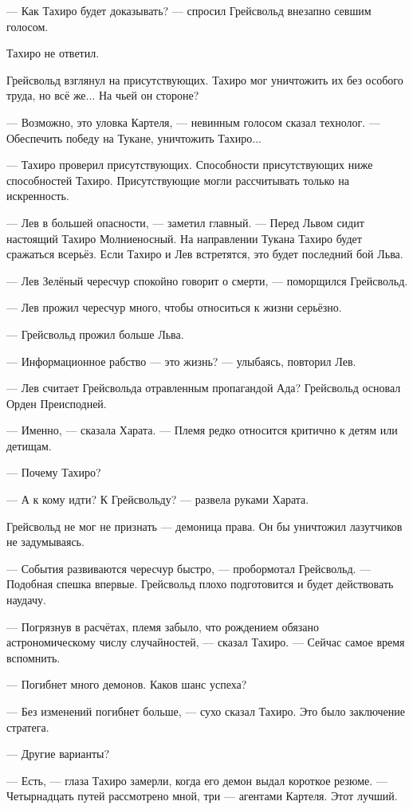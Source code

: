 --- Как Тахиро будет доказывать? --- спросил Грейсвольд внезапно севшим голосом.

Тахиро не ответил.

Грейсвольд взглянул на присутствующих.
Тахиро мог уничтожить их без особого труда, но всё же...
На чьей он стороне?

--- Возможно, это уловка Картеля, --- невинным голосом сказал технолог.
--- Обеспечить победу на Тукане, уничтожить Тахиро...

--- Тахиро проверил присутствующих.
Способности присутствующих ниже способностей Тахиро.
Присутствующие могли рассчитывать только на искренность.

--- Лев в большей опасности, --- заметил главный.
--- Перед Львом сидит настоящий Тахиро Молниеносный.
На направлении Тукана Тахиро будет сражаться всерьёз.
Если Тахиро и Лев встретятся, это будет последний бой Льва.

--- Лев Зелёный чересчур спокойно говорит о смерти, --- поморщился Грейсвольд.

--- Лев прожил чересчур много, чтобы относиться к жизни серьёзно.

--- Грейсвольд прожил больше Льва.

--- Информационное рабство --- это жизнь? --- улыбаясь, повторил Лев.

--- Лев считает Грейсвольда отравленным пропагандой Ада?
Грейсвольд основал Орден Преисподней.

--- Именно, --- сказала Харата.
--- Племя редко относится критично к детям или детищам.

--- Почему Тахиро?

--- А к кому идти?
К Грейсвольду? --- развела руками Харата.

Грейсвольд не мог не признать --- демоница права.
Он бы уничтожил лазутчиков не задумываясь.

--- События развиваются чересчур быстро, --- пробормотал Грейсвольд.
--- Подобная спешка впервые.
Грейсвольд плохо подготовится и будет действовать наудачу.

--- Погрязнув в расчётах, племя забыло, что рождением обязано астрономическому числу случайностей, --- сказал Тахиро.
--- Сейчас самое время вспомнить.

--- Погибнет много демонов.
Каков шанс успеха?

--- Без изменений погибнет больше, --- сухо сказал Тахиро.
Это было заключение стратега.

--- Другие варианты?

--- Есть, --- глаза Тахиро замерли, когда его демон выдал короткое резюме.
--- Четырнадцать путей рассмотрено мной, три --- агентами Картеля.
Этот лучший.

